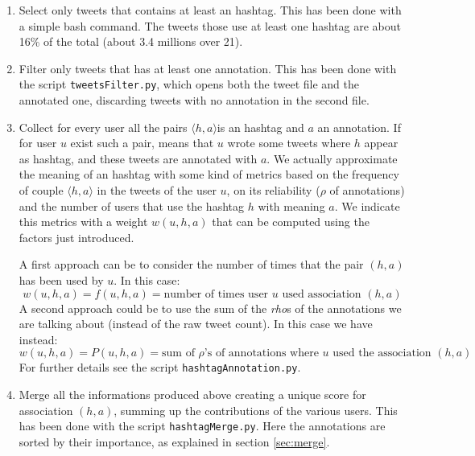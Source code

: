 \documentclass[a4paper,11pt,oneside]{article}
\newcommand{\ha}{$\langle h,a \rangle$}
\begin{document}
\begin{enumerate}
\item Select only tweets that contains at least an hashtag. This has been done with a simple bash command. The tweets those use at least one hashtag are about 16\% of the total (about 3.4 millions over 21).
\item Filter only tweets that has at least one annotation. This has been done with the script \texttt{tweetsFilter.py}, which opens both the tweet file and the annotated one, discarding tweets with no annotation in the second file.
\item Collect for every user all the pairs \ha is an hashtag and $a$ an annotation. If for user $u$ exist such a pair, means that $u$ wrote some tweets where $h$ appear as hashtag, and these tweets are annotated with $a$. 
We actually approximate the meaning of an hashtag with some kind of metrics based on the frequency of couple $\langle h,a \rangle$ in the tweets of the user $u$, on its reliability ($\rho$ of annotations) and the number of users that use the hashtag $h$ with meaning $a$. We indicate this metrics with a weight $w(u,h,a)$ that can be computed using the factors just introduced.

A first approach can be to consider the number of times that the pair $(h,a)$ has been used by $u$. In this case:
\begin{equation}
w(u,h,a) = f(u,h,a) = \text{number of times user $u$ used association $(h,a)$}
\end{equation} 
A second approach could be to use the sum of the \textit{rho}s of the annotations we are talking about (instead of the raw tweet count). In this case we have instead:
\begin{equation}
w(u,h,a) = P(u,h,a) = \text{sum of $\rho$'s of annotations where $u$ used the association $(h,a)$}
\end{equation} 
For further details see the script \texttt{hashtagAnnotation.py}.
\item Merge all the informations produced above creating a unique score for association $(h,a)$, summing up the contributions of the various users. This has been done with the script \texttt{hashtagMerge.py}. Here the annotations are sorted by their importance, as explained in section \ref{sec:merge}.
\end{enumerate}
\end{document}
